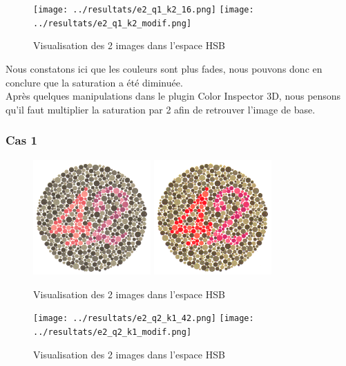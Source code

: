 \documentclass[a4paper]{article}
\begin{document}
\begin{figure}[H]
\begin{center}
\texttt{[image: ../resultats/e2\_q1\_k2\_16.png]}
\texttt{[image: ../resultats/e2\_q1\_k2\_modif.png]}
\end{center}
\caption{Visualisation des 2 images dans l'espace HSB}
\end{figure}

Nous constatons ici que les couleurs sont plus fades, nous pouvons donc en conclure que la saturation a été diminuée.\\
Après quelques manipulations dans le plugin Color Inspector 3D, nous pensons qu'il faut multiplier la saturation par 2 afin de retrouver l'image de base.

\subsubsection{Cas 1}

\begin{figure}[H]
\begin{center}
\includegraphics[width=170px]{../base/cas_1_dalton42.png}
\includegraphics[width=170px]{../base/cas_1_dalton42-question2-2.png}
\end{center}
\caption{Visualisation des 2 images dans l'espace HSB}
\end{figure}

\begin{figure}[H]
\begin{center}
\texttt{[image: ../resultats/e2\_q2\_k1\_42.png]}
\texttt{[image: ../resultats/e2\_q2\_k1\_modif.png]}
\end{center}
\caption{Visualisation des 2 images dans l'espace HSB}
\end{figure}
\end{document}
